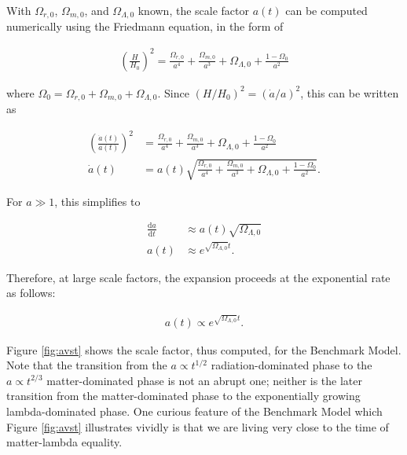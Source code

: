\documentclass[a4paper,11pt]{article}
\begin{document}
{\noindent}With $\Omega_{r,0}$, $\Omega_{m,0}$, and $\Omega_{\Lambda,0}$ known, the scale factor $a(t)$ can be computed numerically using the Friedmann equation, in the form of

\begin{align*}
    \left(\frac{H}{H_0}\right)^2 = \frac{\Omega_{r,0}}{a^4} + \frac{\Omega_{m,0}}{a^3} + \Omega_{\Lambda,0} + \frac{1-\Omega_0}{a^2}
\end{align*}

{\noindent}where $\Omega_0=\Omega_{r,0}+\Omega_{m,0}+\Omega_{\Lambda,0}$. Since $(H/H_0)^2=(\dot{a}/a)^2$, this can be written as

\begin{align*}
    \left(\frac{\dot{a}(t)}{a(t)}\right)^2 &= \frac{\Omega_{r,0}}{a^4} + \frac{\Omega_{m,0}}{a^3} + \Omega_{\Lambda,0} + \frac{1-\Omega_0}{a^2} \\
    \dot{a}(t) &= a(t)\sqrt{\frac{\Omega_{r,0}}{a^4} + \frac{\Omega_{m,0}}{a^3} + \Omega_{\Lambda,0} + \frac{1-\Omega_0}{a^2}}.
\end{align*}

{\noindent}For $a\gg1$, this simplifies to

\begin{align*}
    \frac{\mathrm{d}a}{\mathrm{d}t} &\approx a(t)\sqrt{\Omega_{\Lambda,0}} \\
    a(t) &\approx e^{\sqrt{\Omega_{\Lambda,0}}t}.
\end{align*}

{\noindent}Therefore, at large scale factors, the expansion proceeds at the exponential rate as follows:

\begin{align*}
    a(t) \propto e^{\sqrt{\Omega_{\Lambda,0}}t}.
\end{align*}

{\noindent}Figure \ref{fig:avst} shows the scale factor, thus computed, for the Benchmark Model. Note that the transition from the $a\propto t^{1/2}$ radiation-dominated phase to the $a\propto t^{2/3}$ matter-dominated phase is not an abrupt one; neither is the later transition from the matter-dominated phase to the exponentially growing lambda-dominated phase. One curious feature of the Benchmark Model which Figure \ref{fig:avst} illustrates vividly is that we are living very close to the time of matter-lambda equality.
\end{document}
